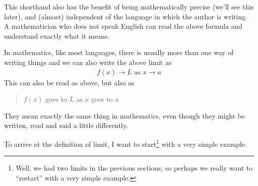 This shorthand also has the benefit of being mathematically precise (we'll see
this later), and (almost) independent of the language in which the author is
writing. A mathematician who does not speak English can read the above formula
and understand exactly what it means.

In mathematics, like most languages, there is usually more than one way of
writing things and we can also write the above limit as
\begin{align*}
  f(x) \to L \mbox{ as } x \to a
\end{align*}
This can also be read as above, but also as
\begin{quote}
  $f(x)$ goes to $L$ as $x$ goes to $a$
\end{quote}
They mean exactly the same thing in mathematics, even though they might be
written, read and said a little differently.


To arrive at the definition of limit, I want to start\footnote{Well, we
had two limits in the previous sections, so perhaps we really want to
``restart'' with a very simple example.} with a very simple example.

